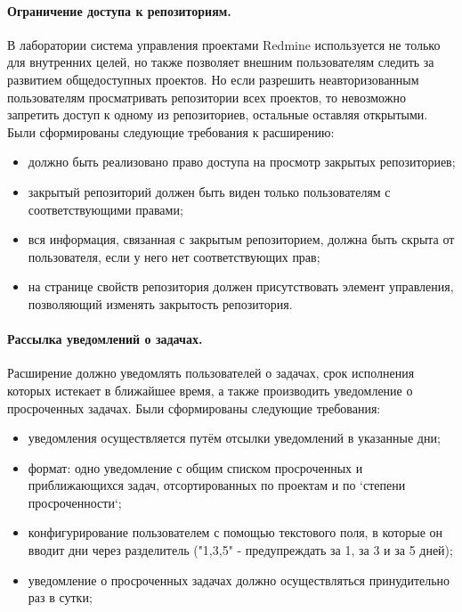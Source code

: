 \paragraph{Ограничение доступа к репозиториям.}
\label{definiton:private_repository}
В лаборатории система управления проектами Redmine используется не только для
внутренних целей, но также позволяет внешним пользователям следить за развитием
общедоступных проектов. Но если разрешить неавторизованным пользователям
просматривать репозитории всех проектов, то невозможно запретить доступ к
одному из репозиториев, остальные оставляя открытыми. Были сформированы
следующие требования к расширению:
\begin{itemize}
  \item должно быть реализовано право доступа на просмотр закрытых
  репозиториев;
  \item закрытый репозиторий должен быть виден только пользователям с
  соответствующими правами;  
  \item вся информация, связанная с закрытым репозиторием, должна быть скрыта
  от пользователя, если у него нет соответствующих прав;
  \item на странице свойств репозитория должен присутствовать элемент
  управления, позволяющий изменять закрытость репозитория.
\end{itemize}

\paragraph{Рассылка уведомлений о задачах.}
\label{definition:due_date_reminder}
Расширение должно уведомлять пользователей о задачах, срок исполнения которых
истекает в ближайшее время, а также производить уведомление о просроченных
задачах. Были сформированы следующие требования:
\begin{itemize}
  \item уведомления осуществляется путём отсылки уведомлений в указанные дни;
  \item формат: одно уведомление с общим списком просроченных и приближающихся
  задач, отсортированных по проектам и по `степени просроченности`; 
  \item конфигурирование пользователем с помощью текстового поля, в которые он
  вводит дни через разделитель ("1,3,5" - предупреждать за 1, за 3 и за 5
  дней);
  \item уведомление о просроченных задачах должно осуществляться принудительно
  раз в сутки;
\end{itemize}

